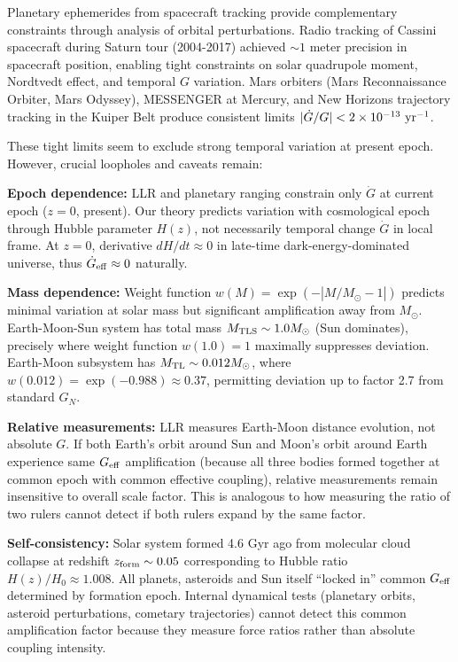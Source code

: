 \documentclass[11pt,a4paper]{article}
\begin{document}
Planetary ephemerides from spacecraft tracking provide complementary
constraints through analysis of orbital perturbations. Radio tracking of
Cassini spacecraft during Saturn tour (2004-2017) achieved \(\sim 1\)
meter precision in spacecraft position, enabling tight constraints on
solar quadrupole moment, Nordtvedt effect, and temporal \(G\) variation.
Mars orbiters (Mars Reconnaissance Orbiter, Mars Odyssey), MESSENGER at
Mercury, and New Horizons trajectory tracking in the Kuiper Belt produce
consistent limits \(|\dot{G}/G| < 2 \times 10^{-13}~{\rm yr^{-1}}\).

These tight limits seem to exclude strong temporal variation at present
epoch. However, crucial loopholes and caveats remain:

\textbf{Epoch dependence:} LLR and planetary ranging constrain only
\(\dot{G}\) at current epoch (\(z = 0\), present). Our theory predicts
variation with cosmological epoch through Hubble parameter \(H(z)\), not
necessarily temporal change \(\dot{G}\) in local frame. At \(z = 0\),
derivative \(dH/dt \approx 0\) in late-time dark-energy-dominated
universe, thus \(\dot{G}_{\rm eff} \approx 0\) naturally.

\textbf{Mass dependence:} Weight function
\(w(M) = \exp(-|M/M_\odot - 1|)\) predicts minimal variation at solar
mass but significant amplification away from \(M_\odot\). Earth-Moon-Sun
system has total mass \(M_{\rm TLS} \sim 1.0 M_\odot\) (Sun dominates),
precisely where weight function \(w(1.0) = 1\) maximally suppresses
deviation. Earth-Moon subsystem has \(M_{\rm TL} \sim 0.012 M_\odot\),
where \(w(0.012) = \exp(-0.988) \approx 0.37\), permitting deviation up
to factor 2.7 from standard \(G_N\).

\textbf{Relative measurements:} LLR measures Earth-Moon distance
evolution, not absolute \(G\). If both Earth's orbit around Sun and
Moon's orbit around Earth experience same \(G_{\rm eff}\) amplification
(because all three bodies formed together at common epoch with common
effective coupling), relative measurements remain insensitive to overall
scale factor. This is analogous to how measuring the ratio of two rulers
cannot detect if both rulers expand by the same factor.

\textbf{Self-consistency:} Solar system formed 4.6 Gyr ago from
molecular cloud collapse at redshift \(z_{\rm form} \sim 0.05\)
corresponding to Hubble ratio \(H(z)/H_0 \approx 1.008\). All planets,
asteroids and Sun itself ``locked in'' common \(G_{\rm eff}\) determined
by formation epoch. Internal dynamical tests (planetary orbits, asteroid
perturbations, cometary trajectories) cannot detect this common
amplification factor because they measure force ratios rather than
absolute coupling intensity.
\end{document}

